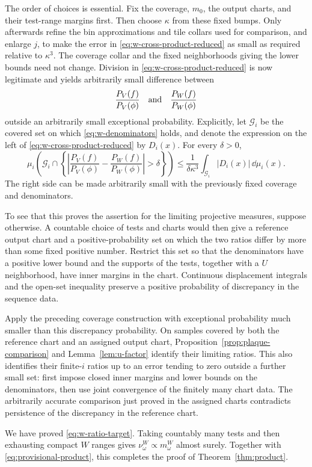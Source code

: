The order of choices is essential.  Fix the coverage, \(m_0\),
the output charts, and their test-range margins first.  Then
choose \(\kappa\) from these fixed bumps.  Only afterwards refine
the bin approximations and tile collars used for comparison,
and enlarge \(j\), to make the error in
\eqref{eq:w-cross-product-reduced} as small as required relative
to \(\kappa^3\).  The coverage collar and the fixed neighborhoods
giving the lower bounds need not change.  Division in
\eqref{eq:w-cross-product-reduced} is now legitimate and yields
arbitrarily small difference between
\[
                         \frac{P_V(f)}{P_V(\phi)}
                 \quad\hbox{and}\quad
                         \frac{P_W(f)}{P_W(\phi)}
\]
outside an arbitrarily small exceptional probability.
Explicitly, let \(\mathcal G_i\) be the covered set on which
\eqref{eq:w-denominators} holds, and denote the expression on the
left of \eqref{eq:w-cross-product-reduced} by \(D_i(x)\).
For every \(\delta>0\),
\[
 \mu_i\left(\mathcal G_i\cap
   \left\{\left|\frac{P_V(f)}{P_V(\phi)}
                -\frac{P_W(f)}{P_W(\phi)}\right|>\delta\right\}\right)
       \le \frac{1}{\delta\kappa^3}
                \int_{\mathcal G_i}|D_i(x)|\,\dd\mu_i(x).
\]
The right side can be made arbitrarily small with the previously
fixed coverage and denominators.

To see that this proves the assertion for the limiting
projective measures, suppose otherwise.  A countable choice of
tests and charts would then give a reference output chart and
a positive-probability set on which the two ratios differ by
more than some fixed positive number.  Restrict this set so
that the denominators have a positive lower bound and the
supports of the tests, together with a \(U\) neighborhood, have
inner margins in the chart.  Continuous displacement integrals
and the open-set inequality preserve a positive probability
of discrepancy in the sequence data.

Apply the preceding coverage construction with exceptional
probability much smaller than this discrepancy probability.
On samples covered by both the reference chart and an assigned
output chart, Proposition~\ref{prop:plaque-comparison} and
Lemma~\ref{lem:u-factor} identify their limiting ratios.
This also identifies their finite-\(i\) ratios up to an error
tending to zero outside a further small set: first impose
closed inner margins and lower bounds on the denominators,
then use joint convergence of the finitely many chart data.
The arbitrarily accurate comparison just proved in the
assigned charts contradicts persistence of the discrepancy
in the reference chart.

We have proved \eqref{eq:w-ratio-target}.  Taking countably many
tests and then exhausting compact \(W\) ranges gives
\(\nu^W_\omega\propto m^W_\omega\) almost surely.
Together with \eqref{eq:provisional-product}, this completes
the proof of Theorem~\ref{thm:product}.
